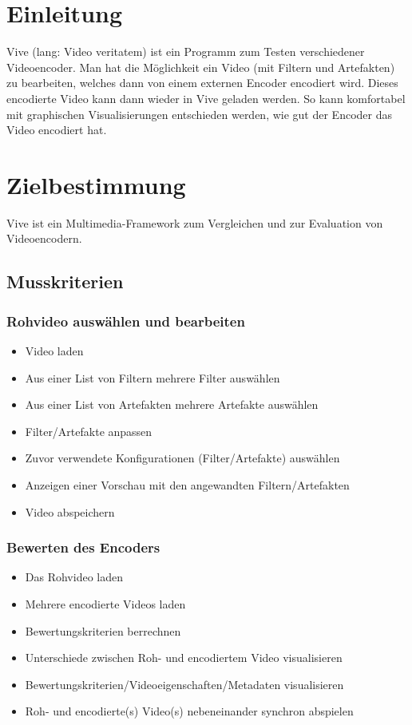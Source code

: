 \documentclass[parskip=full]{scrartcl}
\author {Carina Weber, Jan Benedikt Schwarz, Johannes Werner, Noel Schuhmacher,\\
Sascha Rapp, Simon Grafenhorst}
\begin{document}
\maketitle
\thispagestyle{empty}
\newpage
\tableofcontents
\newpage
\section{Einleitung}
Vive (lang: Video veritatem) ist ein Programm zum Testen verschiedener Videoencoder. Man hat die Möglichkeit ein Video (mit Filtern und Artefakten) zu bearbeiten, welches dann von einem externen Encoder encodiert wird. Dieses encodierte Video kann dann wieder in Vive geladen werden. So kann komfortabel mit graphischen Visualisierungen entschieden werden, wie gut der Encoder das Video encodiert hat.
\newpage
\section{Zielbestimmung}
Vive ist ein Multimedia-Framework zum Vergleichen und zur Evaluation von Videoencodern.
\subsection{Musskriterien}
\subsubsection{Rohvideo auswählen und bearbeiten}
\begin{itemize}
\item Video laden
\item Aus einer List von Filtern mehrere Filter auswählen
\item Aus einer List von Artefakten mehrere Artefakte auswählen
\item Filter/Artefakte anpassen
\item Zuvor verwendete Konfigurationen (Filter/Artefakte) auswählen
\item Anzeigen einer Vorschau mit den angewandten Filtern/Artefakten
\item Video abspeichern
\end{itemize}
\subsubsection{Bewerten des Encoders}
\begin{itemize}
\item Das Rohvideo laden
\item Mehrere encodierte Videos laden
\item Bewertungskriterien berrechnen
\item Unterschiede zwischen Roh- und encodiertem Video visualisieren
\item Bewertungskriterien/Videoeigenschaften/Metadaten visualisieren
\item Roh- und encodierte(s) Video(s) nebeneinander synchron abspielen
\end{itemize}
\newpage
\end{document}
